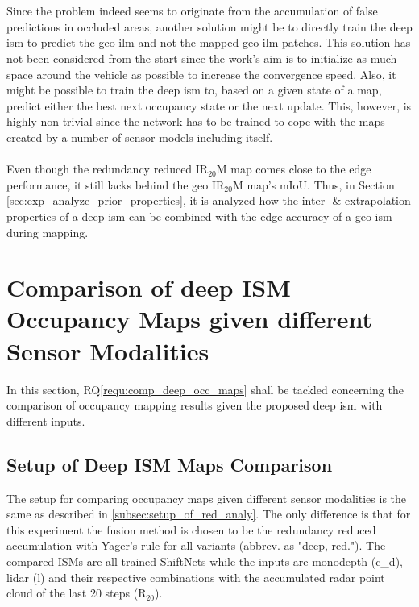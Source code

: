 \\\\
Since the problem indeed seems to originate from the accumulation of false predictions in occluded areas, another solution might be to directly train the deep \gls{ism} to predict the geo \gls{ilm} and not the mapped geo \gls{ilm} patches. This solution has not been considered from the start since the work's aim is to initialize as much space around the vehicle as possible to increase the convergence speed. Also, it might be possible to train the deep \gls{ism} to, based on a given state of a map, predict either the best next occupancy state or the next update. This, however, is highly non-trivial since the network has to be trained to cope with the maps created by a number of sensor models including itself. 
\\\\
Even though the redundancy reduced IR$_{20}$M map comes close to the edge performance, it still lacks behind the geo IR$_{20}$M map's mIoU. Thus, in Section \ref{sec:exp_analyze_prior_properties}, it is analyzed how the inter- \& extrapolation properties of a deep \gls{ism} can be combined with the edge accuracy of a geo \gls{ism} during mapping.
%
\section{Comparison of deep ISM Occupancy Maps given different Sensor Modalities}
\label{sec:exp_comparison_deep_ism_maps_diff_sensors}
In this section, RQ\ref{requ:comp_deep_occ_maps} shall be tackled concerning the comparison of occupancy mapping results given the proposed deep \gls{ism} with different inputs.
%
\subsection{Setup of Deep ISM Maps Comparison}
\label{subsec:setup_analyze_deep_ism_maps_diff_sensors}
The setup for comparing occupancy maps given different sensor modalities is the same as described in \ref{subsec:setup_of_red_analy}. The only difference is that for this experiment the fusion method is chosen to be the redundancy reduced accumulation with Yager's rule for all variants (abbrev. as "deep, red."). The compared ISMs are all trained ShiftNets while the inputs are \gls{monodepth} (\gls{c_d}), lidar (\gls{l}) and their respective combinations with the accumulated radar point cloud of the last 20 steps (R$_{20}$). 
%

